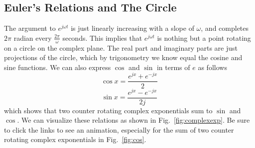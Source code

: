 \subsection{Euler's Relations and The Circle}
The argument to $e^{j \omega t}$ is just linearly increasing with a slope of $\omega$, and completes $2\pi$ radian every $\frac{2\pi}{\omega}$ seconds.  This implies that $e^{j \omega t}$ is nothing but a point rotating on a circle on the complex plane.  The real part and imaginary parts are just projections of the circle, which by trigonometry we know equal the cosine and sine functions.
 We can also express $\cos$ and $\sin$ in terms of $e$ as follows
    \begin{equation}
        \cos x = \frac{e^{jx} + e^{-jx}}{2}
    \end{equation}
    \begin{equation}
        \sin x = \frac{e^{jx} - e^{-jx}}{2j}
    \end{equation}
which shows that two counter rotating complex exponentials sum to $\sin$ and $\cos$.  We can visualize these relations as shown in Fig.~\ref{fig:complexexp}.  Be sure to click the links to see an animation, especially for the sum of two counter rotating complex exponentials in Fig.~\ref{fig:cos}.
